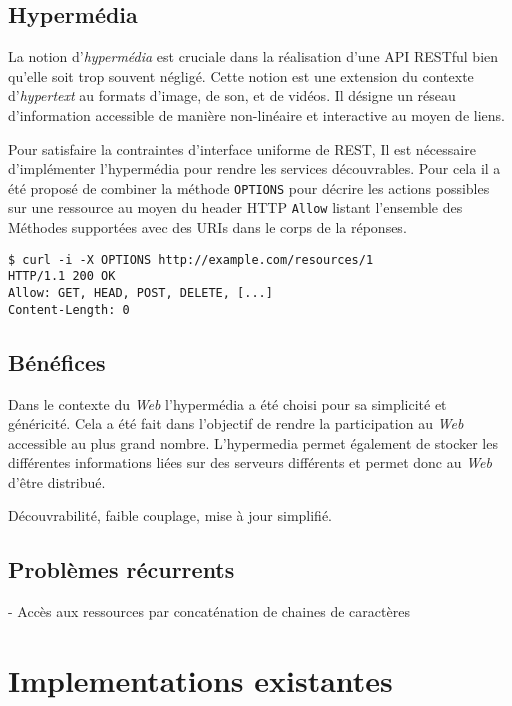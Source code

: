 \documentclass[a4paper, 11pt]{report}
\begin{document}
\subsection{Hypermédia}

La notion d'\emph{hypermédia} est cruciale dans la réalisation d'une
API RESTful bien qu'elle soit trop souvent négligé.  Cette notion est
une extension du contexte d'\emph{hypertext} au formats d'image, de
son, et de vidéos.  Il désigne un réseau d'information accessible de
manière non-linéaire et interactive au moyen de liens.

Pour satisfaire la contraintes d'interface uniforme de REST, Il est
nécessaire d'implémenter l'hypermédia pour rendre les services
découvrables. Pour cela il a été proposé de combiner la méthode
\verb=OPTIONS= pour décrire les actions possibles sur une ressource au
moyen du header HTTP \verb=Allow= listant l'ensemble des Méthodes
supportées avec des URIs dans le corps de la réponses.

\begin{verbatim}
$ curl -i -X OPTIONS http://example.com/resources/1
HTTP/1.1 200 OK
Allow: GET, HEAD, POST, DELETE, [...]
Content-Length: 0
\end{verbatim}

\subsection{Bénéfices}

Dans le contexte du \emph{Web} l'hypermédia a été choisi pour sa
simplicité et généricité.  Cela a été fait dans l'objectif de rendre
la participation au \emph{Web} accessible au plus grand nombre.
L'hypermedia permet également de stocker les différentes informations
liées sur des serveurs différents et permet donc au \emph{Web} d'être
distribué.

Découvrabilité, faible couplage, mise à jour simplifié.

\subsection{Problèmes récurrents}

- Accès aux ressources par concaténation de chaines de caractères

\section{Implementations existantes}
\end{document}
